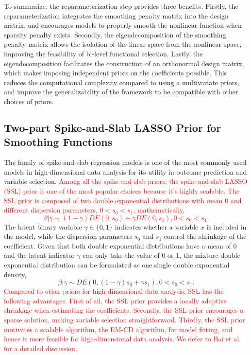 \documentclass[AMA,STIX1COL,]{WileyNJD-v2}
\begin{document}
To summarize, the reparameterization step provides three benefits.
Firstly, the reparameterization integrates the smoothing penalty matrix
into the design matrix, and encourages models to properly smooth the
nonlinear function when sparsity penalty exists. Secondly, the
eigendecomposition of the smoothing penalty matrix allows the isolation
of the linear space from the nonlinear space, improving the feasibility
of bi-level functional selection. Lastly, the eigendecomposition
facilitates the construction of an orthonormal design matrix, which
makes imposing independent priors on the coefficients possible. This
reduces the computational complexity compared to using a multivariate
priors, and improve the generalizability of the framework to be
compatible with other choices of priors.

\subsection{Two-part Spike-and-Slab LASSO Prior for Smoothing Functions}\label{sec:method_prior}

The family of spike-and-slab regression models is one of the most
commonly used models in high-dimensional data analysis for its utility
in outcome prediction and variable selection.
\textcolor{red}{Among all the spike-and-slab priors, the spike-and-slab LASSO (SSL) prior \cite{Rockova2018b, Rockova2018} is one of the most popular choices because it's highly scalable. The SSL prior is composed of two double exponential distributions with mean 0 and different dispersion parameters, $0 < s_0 < s_1$, mathematically,
\begin{equation} 
\beta | \gamma \sim (1-\gamma)DE(0, s_0) + \gamma DE(0, s_1), 0 < s_0 < s_1.\nonumber
\end{equation}
} The latent binary variable \(\gamma \in \{0,1\}\) indicates whether a
variable \(x\) is included in the model, while the dispersion parameters
\(s_0\) and \(s_1\) control the shrinkage of the coefficient. Given that
both double exponential distributions have a mean of 0 and the latent
indicator \(\gamma\) can only take the value of 0 or 1, the mixture
double exponential distribution can be formulated as one single double
exponential density, \begin{equation} \label{eq:ssl}
\beta | \gamma \sim DE(0, (1-\gamma)s_0 + \gamma s_1), 0 < s_0 < s_1.
\end{equation}
\textcolor{red}{Compared to other priors for high-dimensional data analysis, SSL has the following advantages. First of all, the SSL prior provides a locally adaptive shrinkage when estimating the coefficients. Secondly, the SSL prior encourages a sparse solution, making variable selection straightforward. Thirdly, the SSL prior motivates a scalable algorithm, the EM-CD algorithm, for model fitting, and hence is more feasible for high-dimensional data analysis. We defer to Bai et al. \cite{Bai2021Review} for a detailed discussion.}
\end{document}

